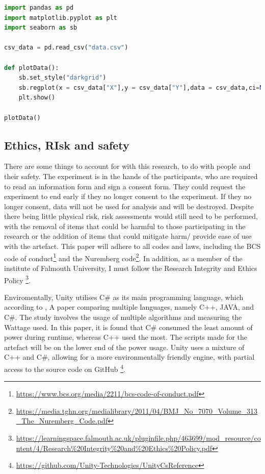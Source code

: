 \documentclass[conference]{IEEEtran}
\begin{document}
%

\begin{lstlisting}[language=Python, caption=Python Script for generating Graphs,captionpos=b]
import pandas as pd
import matplotlib.pyplot as plt
import seaborn as sb

csv_data = pd.read_csv("data.csv")

def plotData():
    sb.set_style("darkgrid")
    sb.regplot(x = csv_data["X"],y = csv_data["Y"],data = csv_data,ci=None)
    plt.show()

plotData()
\end{lstlisting}

\subsection{Ethics, RIsk and safety}
There are some things to account for with this research, to do with people and their safety. The experiment is in the hands of the participants, who are required to read an information form and sign a consent form. They could request the experiment to end early if they no longer consent to the experiment. If they no longer consent, data will not be used for analysis and will be destroyed. Despite there being little physical risk, risk assessments would still need to be performed, with the removal of items that could be harmful to those participating in the research or the addition of items that could mitigate harm/ provide ease of use with the artefact. This paper will adhere to all codes and laws, including the BCS code of conduct\footnote{\url{https://www.bcs.org/media/2211/bcs-code-of-conduct.pdf}} and the Nuremberg code\footnote{\url{https://media.tghn.org/medialibrary/2011/04/BMJ_No_7070_Volume_313_The_Nuremberg_Code.pdf}}. In addition, as a member of the institute of Falmouth University, I must follow the Research Integrity and Ethics Policy \footnote{\url{https://learningspace.falmouth.ac.uk/pluginfile.php/463699/mod_resource/content/4/Research\%20Integrity\%20and\%20Ethics\%20Policy.pdf}}. 

Enviromentally, Unity utilises C\# as its main programming language, which according to \cite{Jain2020}, A paper comparing multiple languages, namely C++, JAVA, and C\#. The study involves the usage of multiple algorithms and measuring the Wattage used. In this paper, it is found that C\# consumed the least amount of power during runtime, whereas C++ used the most. The scripts made for the artefact will be on the lower end of the power usage. Unity uses a mixture of C++ and C\#, allowing for a more environmentally friendly engine, with partial access to the source code on GitHub \footnote{\url{https://github.com/Unity-Technologies/UnityCsReference}}.\\
\end{document}
